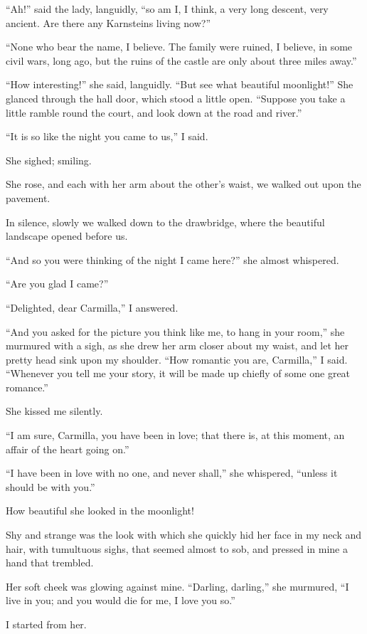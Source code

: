 \documentclass[11pt,twoside,makeidx,hidelinks,]{memoir}
\begin{document}
``Ah!'' said the lady, languidly, ``so am I, I think, a very long descent,
very ancient. Are there any Karnsteins living now?''

``None who bear the name, I believe. The family were ruined, I believe,
in some civil wars, long ago, but the ruins of the castle are only about
three miles away.''

``How interesting!'' she said, languidly. ``But see what beautiful
moonlight!'' She glanced through the hall door, which stood a little
open. ``Suppose you take a little ramble round the court, and look down
at the road and river.''

``It is so like the night you came to us,'' I said.

She sighed; smiling.

She rose, and each with her arm about the other's waist, we walked out
upon the pavement.

In silence, slowly we walked down to the drawbridge, where the beautiful
landscape opened before us.

``And so you were thinking of the night I came here?'' she almost
whispered.

``Are you glad I came?''

``Delighted, dear Carmilla,'' I answered.

``And you asked for the picture you think like me, to hang in your room,''
she murmured with a sigh, as she drew her arm closer about my waist, and
let her pretty head sink upon my shoulder. ``How romantic you are,
Carmilla,'' I said. ``Whenever you tell me your story, it will be made up
chiefly of some one great romance.''

She kissed me silently.

``I am sure, Carmilla, you have been in love; that there is, at this
moment, an affair of the heart going on.''

``I have been in love with no one, and never shall,'' she whispered,
``unless it should be with you.''

How beautiful she looked in the moonlight!

Shy and strange was the look with which she quickly hid her face in my
neck and hair, with tumultuous sighs, that seemed almost to sob, and
pressed in mine a hand that trembled.

Her soft cheek was glowing against mine. ``Darling, darling,'' she
murmured, ``I live in you; and you would die for me, I love you so.''

I started from her.
\end{document}
